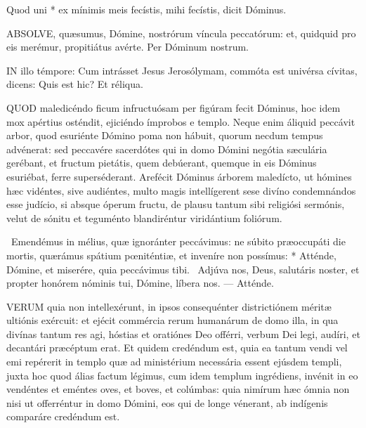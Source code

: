  Quod uni * ex mínimis meis fecístis, mihi fecístis, dicit Dóminus.


\lettrine[lines=2]{A}{BSOLVE}, quæsumus, Dómine, nostrórum víncula peccatórum: et, quidquid pro eis merémur, propitiátus avérte. Per Dóminum nostrum.

\sectionornament




\lettrine[lines=2]{I}{N} illo témpore: Cum intrásset Jesus Jerosólymam, commóta est univérsa cívitas, dicens: Quis est hic? Et réliqua.



\lettrine[lines=2]{Q}{UOD} maledicéndo ficum infructuósam per figúram fecit Dóminus, hoc idem mox apértius osténdit, ejiciéndo ímprobos e templo. Neque enim áliquid peccávit arbor, quod esuriénte Dómino poma non hábuit, quorum necdum tempus advénerat: sed peccavére sacerdótes qui in domo Dómini negótia sæculária gerébant, et fructum pietátis, quem debúerant, quemque in eis Dóminus esuriébat, ferre superséderant. Arefécit Dóminus árborem maledícto, ut hómines hæc vidéntes, sive audiéntes, multo magis intellígerent sese divíno condemnándos esse judício, si absque óperum fructu, de plausu tantum sibi religiósi sermónis, velut de sónitu et teguménto blandiréntur viridántium foliórum.

\R\ Emendémus in mélius, quæ ignoránter peccávimus: ne súbito præoccupáti die mortis, quærámus spátium pœniténtiæ, et inveníre non possímus: * Atténde, Dómine, et miserére, quia peccávimus tibi. \V\ Adjúva nos, Deus, salutáris noster, et propter honórem nóminis tui, Dómine, líbera nos. --- Atténde.


\lettrine[lines=2]{V}{ERUM} quia non intellexérunt, in ipsos consequénter districtiónem méritæ ultiónis exércuit: et ejécit commércia rerum humanárum de domo illa, in qua divínas tantum res agi, hóstias et oratiónes Deo offérri, verbum Dei legi, audíri, et decantári præcéptum erat. Et quidem credéndum est, quia ea tantum vendi vel emi repérerit in templo quæ ad ministérium necessária essent ejúsdem templi, juxta hoc quod álias factum légimus, cum idem templum ingrédiens, invénit in eo vendéntes et eméntes oves, et boves, et colúmbas: quia nimírum hæc ómnia non nisi ut offerréntur in domo Dómini, eos qui de longe vénerant, ab indígenis comparáre credéndum est.

